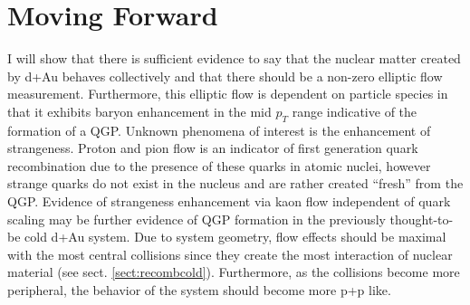 \section{Moving Forward}
I will show that there is sufficient evidence to say that the nuclear matter created by d+Au behaves collectively and that there should be a non-zero elliptic flow measurement. Furthermore, this elliptic flow is dependent on particle species in that it exhibits baryon enhancement in the mid $p_T$ range indicative of the formation of a QGP. Unknown phenomena of interest is the enhancement of strangeness. Proton and pion flow is an indicator of first generation quark recombination due to the presence of these quarks in atomic nuclei, however strange quarks do not exist in the nucleus and are rather created ``fresh'' from the QGP.  Evidence of strangeness enhancement via kaon flow independent of quark scaling may be further evidence of QGP formation in the previously thought-to-be cold d+Au system. Due to system geometry, flow effects should be maximal with the most central collisions since they create the most interaction of nuclear material (see sect. \ref{sect:recombcold}). Furthermore, as the collisions become more peripheral, the behavior of the system should become more p+p like.
\pagebreak
\pagebreak
